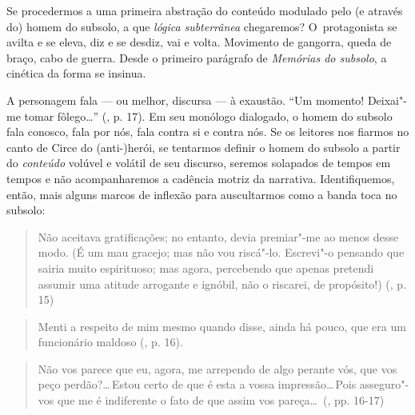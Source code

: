 Se procedermos a uma primeira abstração do conteúdo modulado pelo (e
através do) homem do subsolo, a que \emph{lógica} \emph{subterrânea}
chegaremos? O~protagonista se avilta e se eleva, diz e se desdiz, vai e
volta. Movimento de gangorra, queda de braço, cabo de guerra. Desde o
primeiro parágrafo de \emph{Memórias do subsolo}, a cinética da forma se
insinua.

A personagem fala --- ou melhor, discursa --- à exaustão. ``Um momento!
Deixai"-me tomar fôlego\ldots'' (, p. 17). Em seu monólogo dialogado, o
homem do subsolo fala conosco, fala por nós, fala contra si e contra
nós. Se os leitores nos fiarmos no canto de Circe do \mbox{(anti-)herói}, se
tentarmos definir o homem do subsolo a partir do \emph{conteúdo} volúvel
e volátil de seu discurso, seremos solapados de tempos em tempos e não
acompanharemos a cadência motriz da narrativa. Identifiquemos, então,
mais alguns marcos de inflexão para auscultarmos como a banda toca no
subsolo:

\begin {quote}
Não aceitava gratificações; no entanto, devia premiar"-me ao menos desse
modo. (É um mau gracejo; mas não vou riscá"-lo. Escrevi"-o pensando que
sairia muito espirituoso; mas agora, percebendo que apenas pretendi
assumir uma atitude arrogante e ignóbil, não o riscarei, de propósito!)
(, p. 15)
\end{quote}

\begin{quote}
Menti a respeito de mim mesmo quando disse, ainda há pouco, que era um
funcionário maldoso (, p. 16).
\end{quote}

\begin{quote}
Não vos parece que eu, agora, me arrependo de algo perante vós, que vos
peço perdão?\ldots \,Estou certo de que é esta a vossa impressão\ldots \,Pois
asseguro"-vos que me é indiferente o fato de que assim vos pareça\ldots
\,(, pp. 16-17)
\end{quote}

